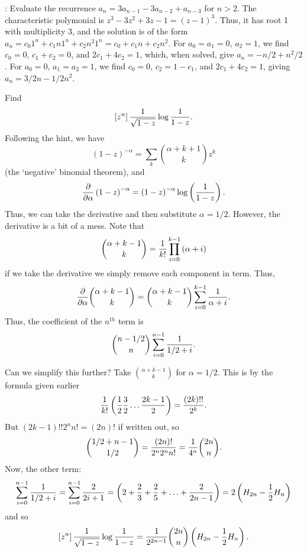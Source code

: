\vskip 0.08in : Evaluate the
recurrence $a_n = 3 a_{n-1} - 3 a_{n-2} + a_{n-3}$ for $n > 2$.\hfil\break
The characteristic polymonial is $z^3 - 3 z^2 + 3 z - 1 = \left(z - 1\right)^3$.
Thus, it has root 1 with multiplicity 3, and the solution is of the form
$a_n = c_0 1^n + c_1 n 1^n + c_2 n^2 1^n = c_0 + c_1 n + c_2 n^2$.
For $a_0 = a_1 = 0$, $a_2 = 1$, we find $c_0 = 0$, $c_1 + c_2 = 0$,
and $2 c_1 + 4 c_2 = 1$, which, when solved, give $a_n = -n / 2 + n^2/2$.
For $a_0 = 0$, $a_1 = a_2 = 1$, we find $c_0 = 0$, $c_2 = 1 - c_1$,
and $2 c_1 + 4 c_2 = 1$, giving $a_n = 3/2 n - 1/2 n^2$.

\vskip 0.08in  Find
$$
 \left[z^n\right] {1 \over \sqrt{1 - z}} \log {1 \over 1 - z}.
$$
Following the hint, we
have
$$
 \left(1 - z\right)^{-\alpha} = \sum_k {\alpha + k + 1 \choose k} z^k
$$
(the `negative' binomial theorem), and
$$
 {\partial \over \partial \alpha} \left(1 - z \right)^{-\alpha}
  = \left(1 - z\right)^{-\alpha} \log \left({1 \over 1 - z}\right).
$$
Thus, we can take the derivative and then substitute $\alpha = 1/2$.
However, the derivative is a bit of a mess.  Note that
$$
  {\alpha + k - 1 \choose k} = {1 \over k!} \prod_{i=0}^{k-1} \left(\alpha + i\right)
$$
if we take the derivative we simply remove each component in term.  Thus,
$$
 {\partial \over \partial \alpha} {\alpha + k - 1 \choose k} =
  {\alpha + k - 1 \choose k} \sum_{i=0}^{k-1} {1 \over \alpha + i}.
$$
Thus, the coefficient of the $n^{th}$ term is
$$
 {n - 1/2 \choose n} \sum_{i=0}^{n-1} {1 \over 1/2 + i}.
$$

Can we simplify this further?  Take $\alpha + k - 1 \choose k$ for $\alpha = 1/2$.
This is by the formula given earlier 
$$
 {1 \over k!} \left({1 \over 2} {3 \over 2} \ldots {2k - 1 \over 2}\right) =
  {\left(2k\right)!! \over 2^k}.
$$
But $\left(2k - 1\right)!! 2^n n! = \left(2 n\right)!$ if written out,
so
$$
 {1/2 + n - 1 \choose 1/2} = {\left(2 n\right)! \over 2^n 2^n n!} = {1 \over 4^n} {2n \choose n}.
$$
Now, the other term:
$$
 \sum_{i=0}^{n-1} {1 \over 1/2 + i} = \sum_{i=0}^{n-1} {2 \over 2 i + 1}
  = \left(2 + {2 \over 3} + {2 \over 5} + \ldots + {2 \over 2 n - 1}\right)
  = 2 \left(H_{2n} - {1 \over 2} H_n\right)
$$
and so
$$
 \left[z^n\right] {1 \over \sqrt{1 - z}} \log {1 \over 1 - z} =
  {1 \over 2^{2n-1}} {2n \choose n} \left(H_{2n} - {1 \over 2} H_n\right).
$$

